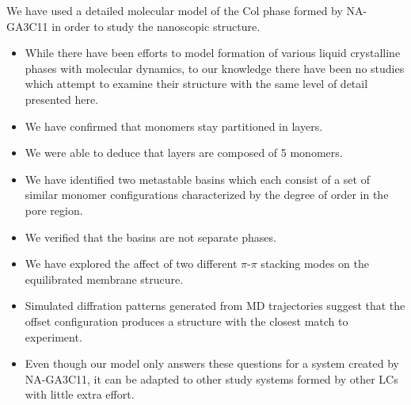 \documentclass{article}
\begin{document}
  We have used a detailed molecular model of the Col phase formed by NA-GA3C11
  in order to study the nanoscopic structure.
  \begin{itemize}
  	\item While there have been efforts to model formation of various liquid crystalline 
	phases with molecular dynamics, to our knowledge there have been no studies which 
	attempt to examine their structure with the same level of detail presented here.
	\item We have confirmed that monomers stay partitioned in layers.
	\item We were able to deduce that layers are composed of 5 monomers.
	\item We have identified two metastable basins which each consist of a set of 
	similar monomer configurations characterized by the degree of order in the pore region.
	\item We verified that the basins are not separate phases.
	\item We have explored the affect of two different $\pi$-$\pi$ stacking modes on the equilibrated
	membrane strucure. 
	\item Simulated diffration patterns generated from MD trajectories suggest that
	the offset configuration produces a structure with the closest match to experiment. 
	\item Even though our model only answers these questions for a system created by 
	NA-GA3C11, it can be adapted to other study systems formed by other LCs with 
	little extra effort. 
  \end{itemize}
  
\clearpage

\end{document}
